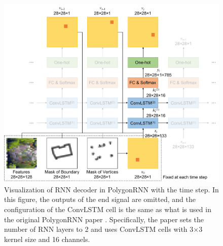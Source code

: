 \begin{figure}[!h]
	\centering
	\includegraphics[width=\fig\textwidth]{3-05.pdf}
    \caption[Visualization of RNN decoder in PolygonRNN with the time step]{Visualization of RNN decoder in PolygonRNN with the time step. In this figure, the outputs of the end signal are omitted, and the configuration of the ConvLSTM cell is the same as what is used in the original PolygonRNN paper \cite{polygonrnn}. Specifically, the paper sets the number of RNN layers to 2 and uses ConvLSTM cells with 3$\times$3 kernel size and 16 channels.}
    \label{fig:rnnconvlstm}
\end{figure}